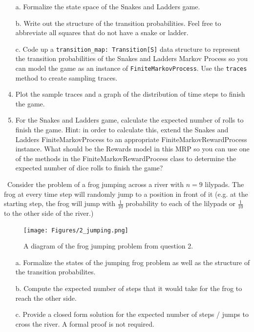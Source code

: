\documentclass[12pt]{exam}
\begin{document}
\begin{questions}
\begin{enumerate}
	\item[a.] Formalize the state space of the Snakes and Ladders game.
	\item[b.] Write out the structure of the transition probabilities. Feel free to abbreviate all squares that do not have a snake or ladder.
	\item[c.] Code up a \lstinline{transition_map: Transition[S]} data structure to represent the transition probabilities of the Snakes and Ladders Markov Process so you can model the game as an instance of \lstinline{FiniteMarkovProcess}. Use the \lstinline{traces} method to create sampling traces.
	\item[d.] Plot the sample traces and a graph of the distribution of time steps to finish the game.
	\item[e.] For the Snakes and Ladders game, calculate the expected number of rolls to finish the game. Hint: in order to calculate this, extend the Snakes and Ladders FiniteMarkovProcess to an appropriate FiniteMarkovRewardProcess instance. What should be the Rewards model in this MRP so you can use one of the methods in the FiniteMarkovRewardProcess class to determine the expected number of dice rolls to finish the game?
\end{enumerate}
\
\question Consider the problem of a frog jumping across a river with $n=9$ lilypads. The frog at every time step will randomly jump to a position in front of it (e.g. at the starting step, the frog will jump with $\frac{1}{10}$ probability to each of the lilypads or $\frac{1}{10}$ to the other side of the river.)
\begin{figure}
	\begin{center}
		\texttt{[image: Figures/2\_jumping.png]}
	\end{center}
	\caption{A diagram of the frog jumping problem from question 2. }
\end{figure}
\begin{enumerate}
	\item[a.] Formalize the states of the jumping frog problem as well as the structure of the transition probabilites.
	\item[b.] Compute the expected number of steps that it would take for the frog to reach the other side.
	\item[c.] Provide a closed form solution for the expected number of steps / jumps to cross the river. A formal proof is not required. 
\end{enumerate}


\end{questions}
\end{document}
